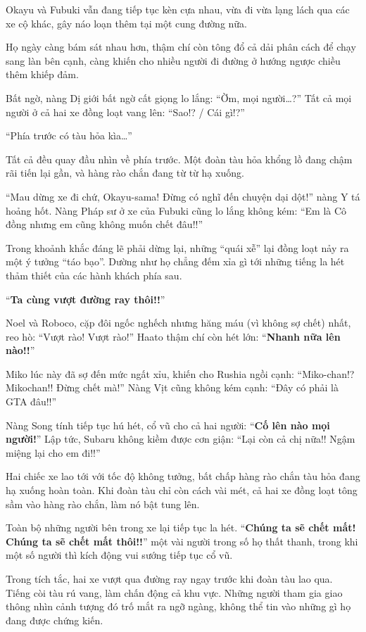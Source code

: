 \documentclass[../main.tex]{subfiles}
\begin{document}
\ct

Okayu và Fubuki vẫn đang tiếp tục kèn cựa nhau, vừa đi vừa lạng lách qua các xe cộ khác, gây náo loạn thêm tại một cung đường nữa.

Họ ngày càng bám sát nhau hơn, thậm chí còn tông đổ cả dải phân cách để chạy sang làn bên cạnh, càng khiến cho nhiều người đi đường ở hướng ngược chiều thêm khiếp đảm.

Bất ngờ, nàng Dị giới bất ngờ cất giọng lo lắng: ``Ờm, mọi người\dots?'' Tất cả mọi người ở cả hai xe đồng loạt vang lên: ``Sao!? / Cái gì!?''

``Phía trước có tàu hỏa kìa\dots''

Tất cả đều quay đầu nhìn về phía trước. Một đoàn tàu hỏa khổng lồ đang chậm rãi tiến lại gần, và hàng rào chắn đang từ từ hạ xuống.

``Mau dừng xe đi chứ, Okayu-sama! Đừng có nghĩ đến chuyện dại dột!'' nàng Y tá hoảng hốt. Nàng Pháp sư ở xe của Fubuki cũng lo lắng không kém: ``Em là Cô đồng nhưng em cũng không muốn chết đâu!!''

Trong khoảnh khắc đáng lẽ phải dừng lại, những ``quái xễ'' lại đồng loạt nảy ra một ý tưởng ``táo bạo''. Dường như họ chẳng đếm xỉa gì tới những tiếng la hét thảm thiết của các hành khách phía sau.

``\textbf{Ta cùng vượt đường ray thôi!!}''

Noel và Roboco, cặp đôi ngốc nghếch nhưng hăng máu (vì không sợ chết) nhất, reo hò: ``Vượt rào! Vượt rào!'' Haato thậm chí còn hét lớn: ``\textbf{Nhanh nữa lên nào!!}''

Miko lúc này đã sợ đến mức ngất xỉu, khiến cho Rushia ngồi cạnh: ``Miko-chan!? Mikochan!! Đừng chết mà!'' Nàng Vịt cũng không kém cạnh: ``Đây có phải là GTA đâu!!''

Nàng Song tính tiếp tục hú hét, cổ vũ cho cả hai người: ``\textbf{Cố lên nào mọi người!}'' Lập tức, Subaru không kiềm được cơn giận: ``Lại còn cả chị nữa!! Ngậm miệng lại cho em đi!!''

Hai chiếc xe lao tới với tốc độ không tưởng, bất chấp hàng rào chắn tàu hỏa đang hạ xuống hoàn toàn. Khi đoàn tàu chỉ còn cách vài mét, cả hai xe đồng loạt tông sầm vào hàng rào chắn, làm nó bật tung lên.

Toàn bộ những người bên trong xe lại tiếp tục la hét. ``\textbf{Chúng ta sẽ chết mất! Chúng ta sẽ chết mất thôi!!}'' một vài người trong số họ thất thanh, trong khi một số người thì kích động vui sướng tiếp tục cổ vũ.

Trong tích tắc, hai xe vượt qua đường ray ngay trước khi đoàn tàu lao qua. Tiếng còi tàu rú vang, làm chấn động cả khu vực. Những người tham gia giao thông nhìn cảnh tượng đó trố mắt ra ngỡ ngàng, không thể tin vào những gì họ đang được chứng kiến.
\end{document}
